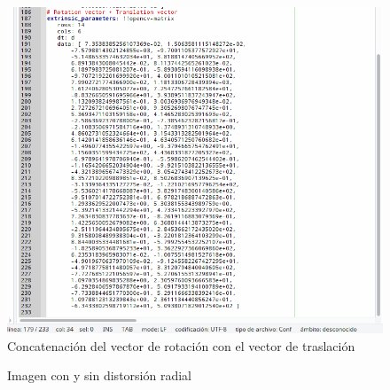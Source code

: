     \begin{figure}[p]
    \centering
    \includegraphics[scale = 0.35]{capitulo_04/figuras_dir/par3.jpg}
    \caption{Concatenación del vector de rotación con el vector de traslación}
    \label{fig: micam3}
    \end{figure}

\begin{figure}[htbp]
\centering
{}
\caption{Imagen con y sin distorsión radial} 
\label{fig: sindistorsion}
\end{figure}
\clearpage


